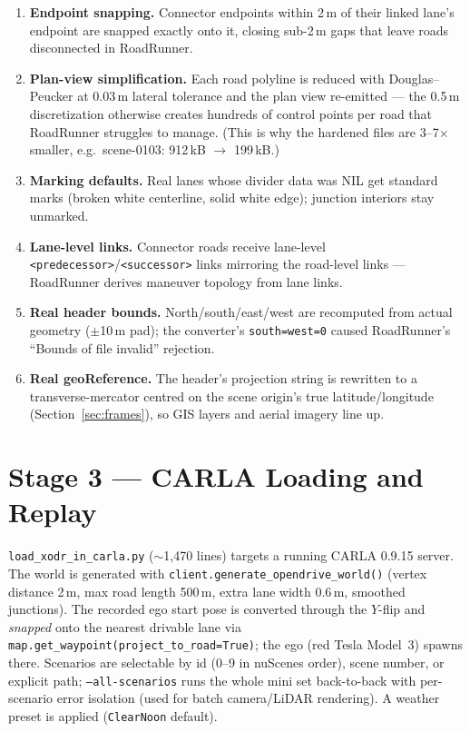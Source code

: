 \documentclass[11pt]{article}
\newcommand{\code}[1]{{\setlength{\fboxsep}{1.5pt}\colorbox{codegray}{\small\texttt{#1}}}}
\newcommand{\file}[1]{\texttt{#1}}
\begin{document}
\begin{enumerate}
\item \textbf{Endpoint snapping.} Connector endpoints within 2\,m of their linked
      lane's endpoint are snapped exactly onto it, closing sub-2\,m gaps that leave
      roads disconnected in RoadRunner.
\item \textbf{Plan-view simplification.} Each road polyline is reduced with
      Douglas--Peucker at 0.03\,m lateral tolerance and the plan view re-emitted ---
      the 0.5\,m discretization otherwise creates hundreds of control points per road
      that RoadRunner struggles to manage. (This is why the hardened files are
      3--7$\times$ smaller, e.g.\ scene-0103: 912\,kB $\rightarrow$ 199\,kB.)
\item \textbf{Marking defaults.} Real lanes whose divider data was NIL get standard
      marks (broken white centerline, solid white edge); junction interiors stay
      unmarked.
\item \textbf{Lane-level links.} Connector roads receive lane-level
      \code{<predecessor>}/\code{<successor>} links mirroring the road-level links ---
      RoadRunner derives maneuver topology from lane links.
\item \textbf{Real header bounds.} North/south/east/west are recomputed from actual
      geometry ($\pm$10\,m pad); the converter's \code{south=west=0} caused
      RoadRunner's ``Bounds of file invalid'' rejection.
\item \textbf{Real geoReference.} The header's projection string is rewritten to a
      transverse-mercator centred on the scene origin's true latitude/longitude
      (Section~\ref{sec:frames}), so GIS layers and aerial imagery line up.
\end{enumerate}

\section{Stage 3 --- CARLA Loading and Replay}
\label{sec:carla}

\file{load\_xodr\_in\_carla.py} ($\sim$1{,}470 lines) targets a running CARLA 0.9.15
server. The world is generated with
\code{client.generate\_opendrive\_world()} (vertex distance 2\,m, max road length
500\,m, extra lane width 0.6\,m, smoothed junctions). The recorded ego start pose is
converted through the $Y$-flip and \emph{snapped} onto the nearest drivable lane via
\code{map.get\_waypoint(project\_to\_road=True)}; the ego (red Tesla Model~3) spawns
there. Scenarios are selectable by id (0--9 in nuScenes order), scene number, or
explicit path; \code{--all-scenarios} runs the whole mini set back-to-back with
per-scenario error isolation (used for batch camera/LiDAR rendering). A weather preset
is applied (\code{ClearNoon} default).
\end{document}
